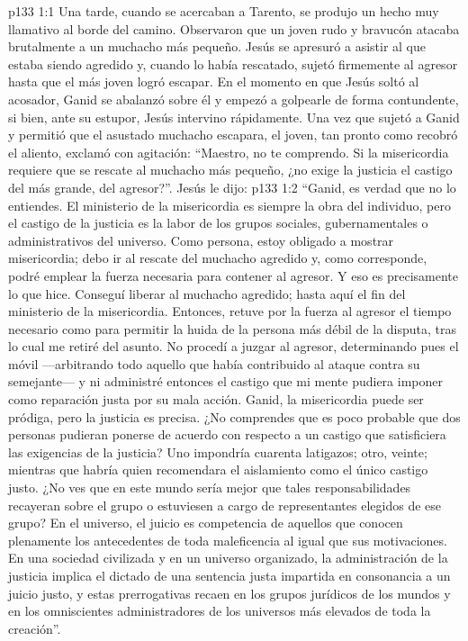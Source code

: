 \vs p133 1:1 Una tarde, cuando se acercaban a Tarento, se produjo un hecho muy llamativo al borde del camino. Observaron que un joven rudo y bravucón atacaba brutalmente a un muchacho más pequeño. Jesús se apresuró a asistir al que estaba siendo agredido y, cuando lo había rescatado, sujetó firmemente al agresor hasta que el más joven logró escapar. En el momento en que Jesús soltó al acosador, Ganid se abalanzó sobre él y empezó a golpearle de forma contundente, si bien, ante su estupor, Jesús intervino rápidamente. Una vez que sujetó a Ganid y permitió que el asustado muchacho escapara, el joven, tan pronto como recobró el aliento, exclamó con agitación: “Maestro, no te comprendo. Si la misericordia requiere que se rescate al muchacho más pequeño, ¿no exige la justicia el castigo del más grande, del agresor?”. Jesús le dijo:
\vs p133 1:2 “Ganid, es verdad que no lo entiendes. El ministerio de la misericordia es siempre la obra del individuo, pero el castigo de la justicia es la labor de los grupos sociales, gubernamentales o administrativos del universo. Como persona, estoy obligado a mostrar misericordia; debo ir al rescate del muchacho agredido y, como corresponde, podré emplear la fuerza necesaria para contener al agresor. Y eso es precisamente lo que hice. Conseguí liberar al muchacho agredido; hasta aquí el fin del ministerio de la misericordia. Entonces, retuve por la fuerza al agresor el tiempo necesario como para permitir la huida de la persona más débil de la disputa, tras lo cual me retiré del asunto. No procedí a juzgar al agresor, determinando pues el móvil ---arbitrando todo aquello que había contribuido al ataque contra su semejante--- y ni administré entonces el castigo que mi mente pudiera imponer como reparación justa por su mala acción. Ganid, la misericordia puede ser pródiga, pero la justicia es precisa. ¿No comprendes que es poco probable que dos personas pudieran ponerse de acuerdo con respecto a un castigo que satisficiera las exigencias de la justicia? Uno impondría cuarenta latigazos; otro, veinte; mientras que habría quien recomendara el aislamiento como el único castigo justo. ¿No ves que en este mundo sería mejor que tales responsabilidades recayeran sobre el grupo o estuviesen a cargo de representantes elegidos de ese grupo? En el universo, el juicio es competencia de aquellos que conocen plenamente los antecedentes de toda maleficencia al igual que sus motivaciones. En una sociedad civilizada y en un universo organizado, la administración de la justicia implica el dictado de una sentencia justa impartida en consonancia a un juicio justo, y estas prerrogativas recaen en los grupos jurídicos de los mundos y en los omniscientes administradores de los universos más elevados de toda la creación”.
